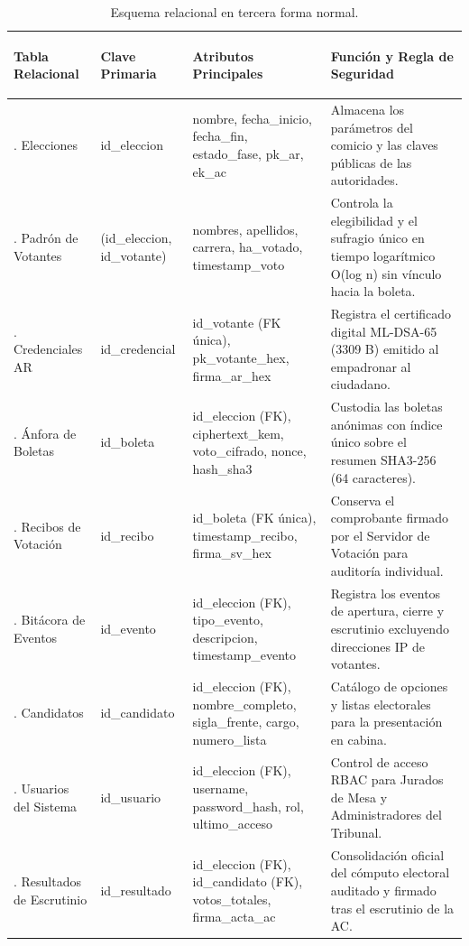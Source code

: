 \begin{table}[!htbp]
	\centering
	\renewcommand{\arraystretch}{1.22}
	\footnotesize
	\begin{tabularx}{\textwidth}{|>{\bfseries\raggedright\arraybackslash}p{2.8cm}|>{\raggedright\arraybackslash}p{2.6cm}|>{\raggedright\arraybackslash}p{4.3cm}|>{\raggedright\arraybackslash}X|}
		\hline
		\textbf{Tabla Relacional} & \textbf{Clave Primaria} & \textbf{Atributos Principales} & \textbf{Función y Regla de Seguridad} \\
		\hline
		1. Elecciones & id\_eleccion & nombre, fecha\_inicio, fecha\_fin, estado\_fase, pk\_ar, ek\_ac & Almacena los parámetros del comicio y las claves públicas de las autoridades. \\
		\hline
		2. Padrón de Votantes & (id\_eleccion, id\_votante) & nombres, apellidos, carrera, ha\_votado, timestamp\_voto & Controla la elegibilidad y el sufragio único en tiempo logarítmico O(log n) sin vínculo hacia la boleta. \\
		\hline
		3. Credenciales AR & id\_credencial & id\_votante (FK única), pk\_votante\_hex, firma\_ar\_hex & Registra el certificado digital ML-DSA-65 (3309 B) emitido al empadronar al ciudadano. \\
		\hline
		4. Ánfora de Boletas & id\_boleta & id\_eleccion (FK), ciphertext\_kem, voto\_cifrado, nonce, hash\_sha3 & Custodia las boletas anónimas con índice único sobre el resumen SHA3-256 (64 caracteres). \\
		\hline
		5. Recibos de Votación & id\_recibo & id\_boleta (FK única), timestamp\_recibo, firma\_sv\_hex & Conserva el comprobante firmado por el Servidor de Votación para auditoría individual. \\
		\hline
		6. Bitácora de Eventos & id\_evento & id\_eleccion (FK), tipo\_evento, descripcion, timestamp\_evento & Registra los eventos de apertura, cierre y escrutinio excluyendo direcciones IP de votantes. \\
		\hline
		7. Candidatos & id\_candidato & id\_eleccion (FK), nombre\_completo, sigla\_frente, cargo, numero\_lista & Catálogo de opciones y listas electorales para la presentación en cabina. \\
		\hline
		8. Usuarios del Sistema & id\_usuario & id\_eleccion (FK), username, password\_hash, rol, ultimo\_acceso & Control de acceso RBAC para Jurados de Mesa y Administradores del Tribunal. \\
		\hline
		9. Resultados de Escrutinio & id\_resultado & id\_eleccion (FK), id\_candidato (FK), votos\_totales, firma\_acta\_ac & Consolidación oficial del cómputo electoral auditado y firmado tras el escrutinio de la AC. \\
		\hline
	\end{tabularx}
	\caption{Esquema relacional en tercera forma normal.}
	\label{tab:diccionario_datos}
	\par{}
\end{table}

